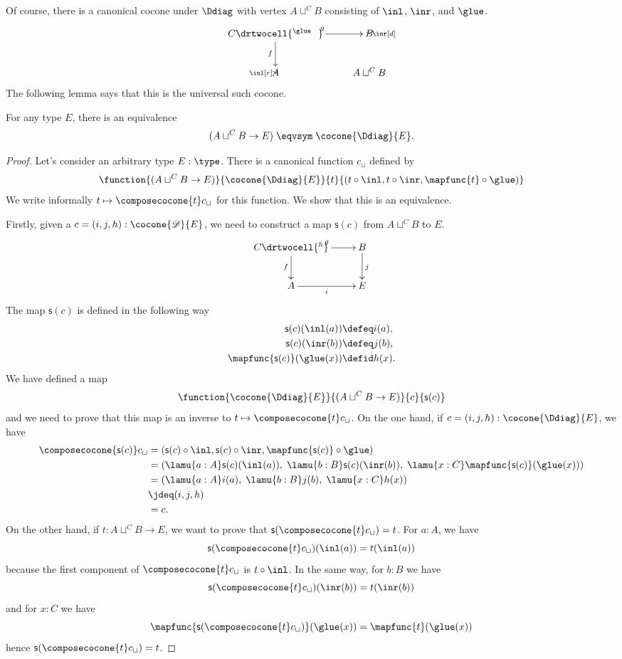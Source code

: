 Of course, there is a canonical cocone under $\Ddiag$ with vertex $A\sqcup^C B$ consisting of $\inl$, $\inr$, and $\glue$.
\[\uppercurveobject{{ }}\lowercurveobject{{ }}\twocellhead{{ }}
\xymatrix{C \ar^g[r] \ar_f[d] \drtwocell{^\glue\ \ } & B \ar^\inr[d] \\
  A \ar_-\inl[r] & A\sqcup^CB }\]
The following lemma says that this is the universal such cocone.

\begin{lem}\label{thm:pushout-ump}
  For any type $E$, there is an equivalence
  \[ (A\sqcup^C B \to E) \;\eqvsym\; \cocone{\Ddiag}{E}. \]
\end{lem}
\begin{proof}
  Let's consider an arbitrary type $E:\type$.
  There is a canonical function $c_\sqcup$ defined by
  \[\function{(A\sqcup^CB\to{}E)}{\cocone{\Ddiag}{E}}
  {t}{(t\circ{}\inl,t\circ{}\inr,\mapfunc{t}\circ{}\glue)}\]
  We write informally $t\mapsto\composecocone{t}c_\sqcup$ for this function.
  We show that this is an equivalence.

  Firstly, given a $c=(i,j,h):\cocone{\mathscr{D}}{E}$, we need to construct a
  map $\mathsf{s}(c)$ from $A\sqcup^CB$ to $E$.
  \[\uppercurveobject{{ }}\lowercurveobject{{ }}\twocellhead{{ }}
  \xymatrix{C \ar^g[r] \ar_f[d] \drtwocell{^h} & B \ar^{j}[d] \\
    A \ar_-{i}[r] & E }\]
 The map $\mathsf{s}(c)$ is defined in the following way
  \begin{align*}
    \mathsf{s}(c)(\inl(a))&\defeq i(a),\\
    \mathsf{s}(c)(\inr(b))&\defeq j(b),\\
    \mapfunc{\mathsf{s}(c)}(\glue(x))&\defid h(x).
  \end{align*}
We have defined a map
\[\function{\cocone{\Ddiag}{E}}{(A\sqcup^CB\to{}E)}{c}{\mathsf{s}(c)}\]
and we need to prove that this map is an inverse to
$t\mapsto{}\composecocone{t}c_\sqcup$.
On the one hand, if $c=(i,j,h):\cocone{\Ddiag}{E}$, we have
\begin{align*}
  \composecocone{\mathsf{s}(c)}c_\sqcup & =
  (\mathsf{s}(c)\circ\inl,\mathsf{s}(c)\circ\inr,
  \mapfunc{\mathsf{s}(c)}\circ\glue) \\
  & = (\lamu{a:A} \mathsf{s}(c)(\inl(a)),\;
  \lamu{b:B} \mathsf{s}(c)(\inr(b)),\;
  \lamu{x:C} \mapfunc{\mathsf{s}(c)}(\glue(x))) \\
  & = (\lamu{a:A} i(a),\;
  \lamu{b:B} j(b),\;
  \lamu{x:C} h(x)) \\
  & \jdeq (i, j, h) \\
  & = c.
\end{align*}
%
On the other hand, if $t:A\sqcup^CB\to{}E$, we want to prove that
$\mathsf{s}(\composecocone{t}c_\sqcup)=t$.
For $a:A$, we have
\[\mathsf{s}(\composecocone{t}c_\sqcup)(\inl(a))=t(\inl(a))\]
because the first component of $\composecocone{t}c_\sqcup$ is $t\circ\inl$. In
the same way, for $b:B$ we have
\[\mathsf{s}(\composecocone{t}c_\sqcup)(\inr(b))=t(\inr(b))\]
and for $x:C$ we have
\[\mapfunc{\mathsf{s}(\composecocone{t}c_\sqcup)}(\glue(x))
=\mapfunc{t}(\glue(x))\]
hence $\mathsf{s}(\composecocone{t}c_\sqcup)=t$.


\end{proof}
